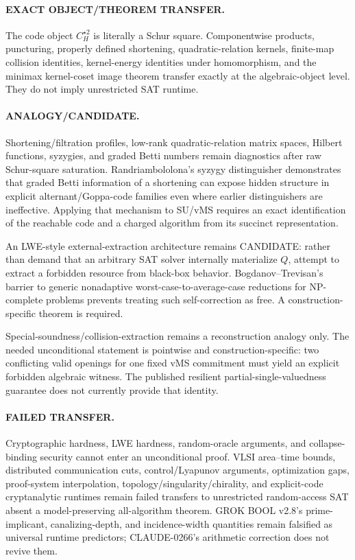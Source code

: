\documentclass[11pt]{article}
\begin{document}
\paragraph{EXACT OBJECT/THEOREM TRANSFER.}
The code object $C_H^{\star2}$ is literally a Schur square. Componentwise products, puncturing, properly defined shortening, quadratic-relation kernels, finite-map collision identities, kernel-energy identities under homomorphism, and the minimax kernel-coset image theorem transfer exactly at the algebraic-object level. They do not imply unrestricted SAT runtime.

\paragraph{ANALOGY/CANDIDATE.}
Shortening/filtration profiles, low-rank quadratic-relation matrix spaces, Hilbert functions, syzygies, and graded Betti numbers remain diagnostics after raw Schur-square saturation. Randriambololona's syzygy distinguisher demonstrates that graded Betti information of a shortening can expose hidden structure in explicit alternant/Goppa-code families even where earlier distinguishers are ineffective. Applying that mechanism to SU/vMS requires an exact identification of the reachable code and a charged algorithm from its succinct representation.

An LWE-style external-extraction architecture remains CANDIDATE: rather than demand that an arbitrary SAT solver internally materialize $Q$, attempt to extract a forbidden resource from black-box behavior. Bogdanov--Trevisan's barrier to generic nonadaptive worst-case-to-average-case reductions for NP-complete problems prevents treating such self-correction as free. A construction-specific theorem is required.

Special-soundness/collision-extraction remains a reconstruction analogy only. The needed unconditional statement is pointwise and construction-specific: two conflicting valid openings for one fixed vMS commitment must yield an explicit forbidden algebraic witness. The published resilient partial-single-valuedness guarantee does not currently provide that identity.

\paragraph{FAILED TRANSFER.}
Cryptographic hardness, LWE hardness, random-oracle arguments, and collapse-binding security cannot enter an unconditional proof. VLSI area--time bounds, distributed communication cuts, control/Lyapunov arguments, optimization gaps, proof-system interpolation, topology/singularity/chirality, and explicit-code cryptanalytic runtimes remain failed transfers to unrestricted random-access SAT absent a model-preserving all-algorithm theorem. GROK BOOL v2.8's prime-implicant, canalizing-depth, and incidence-width quantities remain falsified as universal runtime predictors; CLAUDE-0266's arithmetic correction does not revive them.
\end{document}
